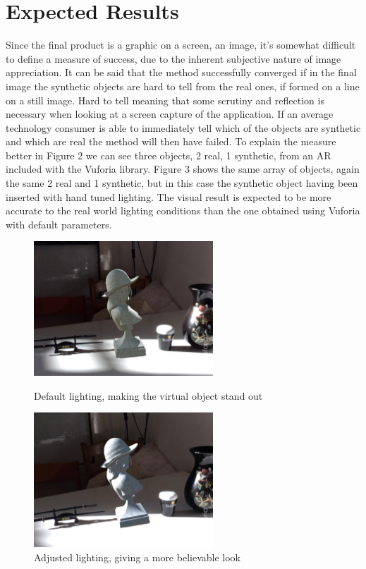 \section{Expected Results}
Since the final product is a graphic on a screen, an image, it's somewhat difficult to define a measure of success, due to the inherent subjective nature of image appreciation. It can be said that the method successfully converged if in the final image the synthetic objects are hard to tell from the real ones, if formed on a line on a still image. Hard to tell meaning that some scrutiny and reflection is necessary when looking at a screen capture of the application. If an average technology consumer is able to immediately tell which of the objects are synthetic and which are real the method will then have failed. To explain the measure better in Figure 2 we can see three objects, 2 real, 1 synthetic, from an AR included with the Vuforia library. Figure 3 shows the same array of objects, again the same 2 real and 1 synthetic, but in this case the synthetic object having been inserted with hand tuned lighting. The visual result is expected to be more accurate to the real world lighting conditions than the one obtained using Vuforia with default parameters.
\begin{figure}[H]
\centering
\includegraphics[width=0.6\textwidth]{Figures/fake.jpg}
\caption{Default lighting, making the virtual object stand out}
\includegraphics[width=0.6\textwidth]{Figures/realish.jpg}
\caption{Adjusted lighting, giving a more believable look}
\end{figure}
